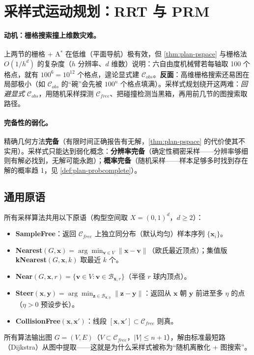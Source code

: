\section{采样式运动规划：RRT 与 PRM}
\label{sec:plan-sampling}

\paragraph{动机：栅格搜索撞上维数灾难。}
上两节的栅格 + A$^*$ 在低维（平面导航）极有效，但 \cref{thm:plan-pspace} 与栅格法 $O(1/h^d)$ 的复杂度（$h$ 分辨率、$d$ 维数）说明：六自由度机械臂若每轴取 100 个格点，就有 $100^6=10^{12}$ 个格点，遑论显式建 $\mathcal{C}_{obs}$。\textbf{反面}：高维栅格搜索还易困在局部极小（如 $\mathcal{C}_{obs}$ 的“碗”会先被 $100^n$ 个格点填满）。采样式规划绕开这两难：\emph{回避显式 $\mathcal{C}_{obs}$}，用随机采样探测 $\mathcal{C}_{free}$、把碰撞检测当黑箱，再用前几节的图搜索取路径。

\paragraph{完备性的弱化。}
精确几何方法\textbf{完备}（有限时间正确报告有无解，\cref{thm:plan-pspace} 的代价使其不实用）。采样式只能达到弱化概念：\textbf{分辨率完备}（确定性稠密采样——分辨率够细则有解必找到，无解可能永跑）；\textbf{概率完备}（随机采样——样本足够多时找到存在解的概率趋 1，见 \cref{def:plan-probcomplete}）。

\subsection{通用原语}
\label{sec:plan-primitives}

所有采样算法共用以下原语\cite{karaman2011sampling}（构型空间取 $X=(0,1)^d$，$d\ge2$）：
\begin{itemize}
  \item \textbf{SampleFree}：返回 $\mathcal{C}_{free}$ 上独立同分布（默认均匀）样本序列 $\{\mathbf{x}_i\}$。
  \item \textbf{Nearest}$(G,\mathbf{x})=\arg\min_{\mathbf{v}\in V}\|\mathbf{x}-\mathbf{v}\|$（欧氏最近顶点）；集值版 \textbf{kNearest}$(G,\mathbf{x},k)$ 取最近 $k$ 个。
  \item \textbf{Near}$(G,\mathbf{x},r)=\{\mathbf{v}\in V:\mathbf{v}\in\mathcal{B}_{\mathbf{x},r}\}$（半径 $r$ 球内顶点）。
  \item \textbf{Steer}$(\mathbf{x},\mathbf{y})=\arg\min_{\mathbf{z}\in\mathcal{B}_{\mathbf{x},\eta}}\|\mathbf{z}-\mathbf{y}\|$：返回从 $\mathbf{x}$ 朝 $\mathbf{y}$ 前进至多 $\eta$ 的点（$\eta>0$ 预设步长）。
  \item \textbf{CollisionFree}$(\mathbf{x},\mathbf{x}')$：线段 $[\mathbf{x},\mathbf{x}']\subset\mathcal{C}_{free}$ 则真。
\end{itemize}
所有算法输出图 $G=(V,E)$（$V\subset\mathcal{C}_{free}$，$|V|\le n+1$），解由标准最短路（Dijkstra）从图中提取——这就是为什么采样式被称为“随机离散化 + 图搜索”。

